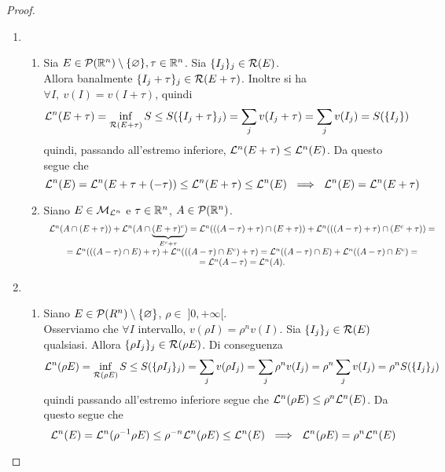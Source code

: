\begin{proof}
\begin{enumerate}[label=$(\arabic*)$]
      \item 
      \begin{enumerate}
          \item Sia $E\in\mathcal{P}(\mathbb{R}^n)\setminus\{\varnothing\}, \tau \in \mathbb{R}^n$. Sia $\{I_j\}_j\in\mathcal{R}(E)$. \hspace{\fill}\\ 
          Allora banalmente $\{I_j+\tau\}_j\in\mathcal{R}(E+\tau)$.  Inoltre si ha $\forall I,\ v(I)=v(I+\tau)$, quindi 
          \[\mathcal{L}^n(E+\tau)=\inf_{\mathcal{R}(E+\tau)}S\leq S(\{I_j+\tau\}_j) = \sum_jv(I_j+\tau)=\sum_jv(I_j)=S(\{I_j\})\]
          quindi, passando all'estremo inferiore, $\mathcal{L}^n(E+\tau)\leq \mathcal{L}^n(E)$. Da questo segue che 
          \[\mc{L}^n(E)=\mc{L}^n(E+\tau+(-\tau))\leq \mc{L}^n(E+\tau)\leq \mc{L}^n(E)\ \implies \ \mc{L}^n(E)=\mc{L}^n(E+\tau)\]
          \item Siano $E\in \mathcal{M}_{\mathcal{L}^n}$ e $\tau \in \mathbb{R}^n$, $A\in \mathcal{P}(\mathbb{R}^n)$.  
          \renewcommand{\arraystretch}{1.8}
          \[\begin{array}{c}
              \mathcal{L}^n(A\cap(E+\tau))+\mathcal{L}^n(A\cap \underbrace{(E+\tau)^c}_{E^c+\tau}) = \mathcal{L}^n(((A-\tau)+\tau)\cap (E+\tau))+ \mathcal{L}^n(((A-\tau)+\tau)\cap (E^c+\tau))=\\
              =\mathcal{L}^n(((A-\tau)\cap E)+\tau)+ \mathcal{L}^n(((A-\tau)\cap E^c)+\tau)=\mathcal{L}^n((A-\tau)\cap E)+ \mathcal{L}^n((A-\tau)\cap E^c)=\\
              =\mathcal{L}^n(A-\tau) = \mathcal{L}^n(A).
          \end{array}\]
          \renewcommand{\arraystretch}{1}
      \end{enumerate}
      \item 
      \begin{enumerate}
          \item Siano $E\in \mathcal{P}(R^n)\setminus \{\varnothing\}$, $\rho\in\;]0,+\infty[$.  \\
          Osserviamo che $\forall I$ intervallo, $v(\rho I)=\rho^nv(I)$. Sia $\{I_j\}_j\in \mathcal{R}(E)$ qualsiasi. Allora $\{\rho I_j\}_j\in \mathcal{R}(\rho E)$. Di conseguenza 
          \[\mathcal{L}^n(\rho E)=\inf_{\mathcal{R}(\rho E)}S\leq S(\{\rho I_j\}_j)=\sum_jv(\rho I_j)=\sum_j\rho^nv(I_j)=\rho^n\sum_jv(I_j)=\rho ^nS(\{I_j\}_j)\]
          quindi passando all'estremo inferiore segue che $\mathcal{L}^n(\rho E)\leq \rho^n\mathcal{L}^n(E)$. Da questo segue che
          \[\mathcal{L}^n(E)=\mathcal{L}^n(\rho^{-1}\rho E)\leq \rho^{-n}\mathcal{L}^n(\rho E)\leq \mathcal{L}^n(E)\ \implies \ \mathcal{L}^n(\rho E)=\rho^n\mathcal{L}^n(E)\]

\end{enumerate}
\end{enumerate}
\end{proof}
